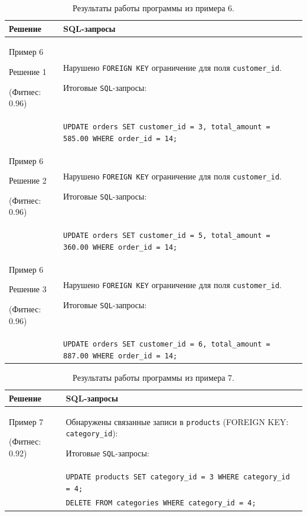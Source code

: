\documentclass[master,paper]{pmk-graduate}
\begin{document}
\begin{table}
	\centering
	\begin{tabularx}{\linewidth}{@{}>{\hsize=0.5\hsize}X>{\hsize=1.5\hsize}X@{}}
		\toprule
		\textbf{Решение} & \textbf{SQL-запросы} \\
		\midrule
		Пример 6
		
		Решение 1
		
		(Фитнес: 0.96) & 
		Нарушено \texttt{FOREIGN KEY} ограничение для поля \texttt{customer\_id}.
		
		Итоговые \texttt{SQL}-запросы: \\
		& \texttt{UPDATE orders SET customer\_id = 3, total\_amount = 585.00 WHERE order\_id = 14;} \\
		\cmidrule{1-2}
		Пример 6
		
		Решение 2
		
		(Фитнес: 0.96) & 
		Нарушено \texttt{FOREIGN KEY} ограничение для поля \texttt{customer\_id}.
		
		Итоговые \texttt{SQL}-запросы: \\
		& \texttt{UPDATE orders SET customer\_id = 5, total\_amount = 360.00 WHERE order\_id = 14;} \\
		\cmidrule{1-2}
		Пример 6
		
		Решение 3
		
		(Фитнес: 0.96) & 
		Нарушено \texttt{FOREIGN KEY} ограничение для поля \texttt{customer\_id}.
		
		Итоговые \texttt{SQL}-запросы: \\
		& \texttt{UPDATE orders SET customer\_id = 6, total\_amount = 887.00 WHERE order\_id = 14;} \\
		\bottomrule
	\end{tabularx}
	\caption{Результаты работы программы из примера 6.}
	\label{table6}
\end{table}

\begin{table}
	\centering
	\begin{tabularx}{\linewidth}{@{}>{\hsize=0.5\hsize}X>{\hsize=1.5\hsize}X@{}}
		\toprule
		\textbf{Решение} & \textbf{SQL-запросы} \\
		\midrule
		Пример 7
		
		(Фитнес: 0.92) & 
		Обнаружены связанные записи в \texttt{products} (FOREIGN KEY: \texttt{category\_id}):
		
		Итоговые \texttt{SQL}-запросы: \\
		& \texttt{UPDATE products SET category\_id = 3 WHERE category\_id = 4;} \\
		& \texttt{DELETE FROM categories WHERE category\_id = 4;} \\
		\bottomrule
	\end{tabularx}
	\caption{Результаты работы программы из примера 7.}
	\label{table7}
\end{table}
\end{document}
